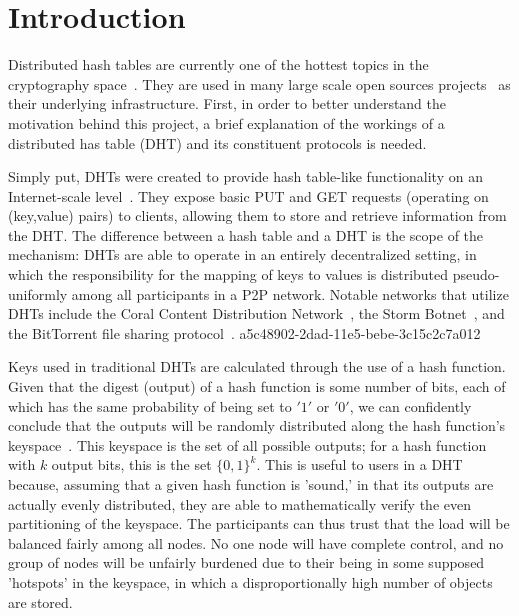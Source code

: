 \documentclass[12pt]{article}
\begin{document}
\section{Introduction}
\par Distributed hash tables are currently one of the hottest topics in the cryptography space~\cite{Stoica:2001dj,Rowstron:2001ea,Ratnasamy:2001wn}. They are used in many large scale open sources projects~\cite{Freitas:2013tb,Xu:2010vs,Perfitt:2010fh} as their underlying infrastructure. First, in order to better understand the motivation behind this project, a brief explanation of the workings of a distributed has table (DHT) and its constituent protocols is needed.

\par Simply put, DHTs were created to provide hash table-like functionality on an Internet-scale level~\cite{Ratnasamy:2001wn}. They expose basic PUT and GET requests (operating on (key,value) pairs) to clients, allowing them to store and retrieve information from the DHT. The difference between a hash table and a DHT is the scope of the mechanism: DHTs are able to operate in an entirely decentralized setting, in which the responsibility for the mapping of keys to values is distributed pseudo-uniformly among all participants in a P2P network. Notable networks that utilize DHTs include the Coral Content Distribution Network~\cite{Freedman:2004vb}, the Storm Botnet~\cite{Holz:2008uk}, and the BitTorrent file sharing protocol~\cite{Cohen:y1_8mBnw}.
a5c48902-2dad-11e5-bebe-3c15c2c7a012
\par Keys used in traditional DHTs are calculated through the use of a hash function. Given that the digest (output) of a hash function is some number of bits, each of which has the same probability of being set to $'1'$ or $'0'$, we can confidently conclude that the outputs will be randomly distributed along the hash function's keyspace~. This keyspace is the set of all possible outputs; for a hash function with $k$ output bits, this is the set $\{0,1\}^k$. This is useful to users in a DHT because, assuming that a given hash function is 'sound,' in that its outputs are actually evenly distributed, they are able to mathematically verify the even partitioning of the keyspace. The participants can thus trust that the load will be balanced fairly among all nodes. No one node will have complete control, and no group of nodes will be unfairly burdened due to their being in some supposed 'hotspots' in the keyspace, in which a disproportionally high number of objects are stored.~
\end{document}
